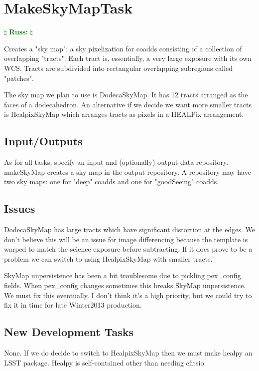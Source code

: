 \documentclass[12pt]{article}
\newcommand{\russ} { \textcolor{green} {
\ensuremath{\natural} {\bf Russ:}  
\ensuremath{\natural} } }
\begin{document}

\clearpage 
\section{MakeSkyMapTask} \russ

Creates a "sky map": a sky pixelization for coadds consisting of a collection of overlapping "tracts".
Each tract is, essentially, a very large exposure with its own WCS.
Tracts are subdivided into rectangular overlapping subregions called "patches".

The sky map we plan to use is DodecaSkyMap. It has 12 tracts arranged as the faces of a dodecahedron.
An alternative if we decide we want more smaller tracts is HealpixSkyMap which arranges
tracts as pixels in a HEALPix arrangement.

\subsection{Input/Outputs}

As for all tasks, specify an input and (optionally) output data repository.
makeSkyMap creates a sky map in the output repository.
A repository may have two sky maps: one for "deep" coadds and one for "goodSeeing" coadds.

\subsection{Issues}
DodecaSkyMap has large tracts which have significant distortion at the edges.
We don't believe this will be an issue for image differencing because the template is warped
to match the science exposure before subtracting. If it does prove to be a problem
we can switch to using HealpixSkyMap with smaller tracts.

SkyMap unpersistence has been a bit troublesome due to pickling pex\_config fields.
When pex\_config changes sometimes this breaks SkyMap unpersistence. We must fix this eventually.
I don't think it's a high priority, but we could try to fix it in time for late Winter2013 production.

\subsection{New Development Tasks}

None. If we do decide to switch to HealpixSkyMap then we must make healpy an LSST package.
Healpy is self-contained other than needing cfitsio.
\end{document}
